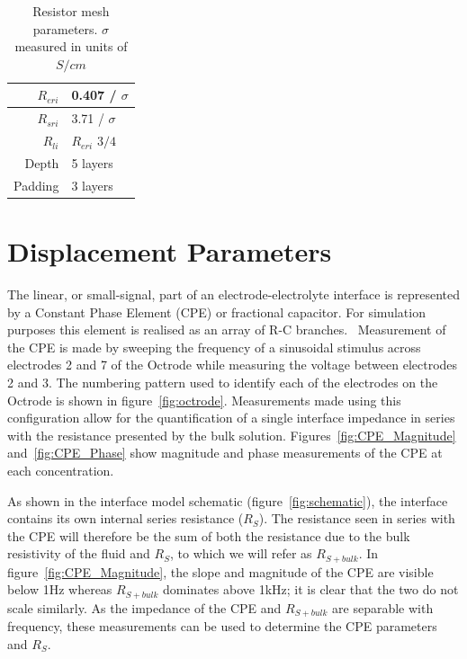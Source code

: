 \documentclass[journal, a4paper]{IEEEtran}
\begin{document}
\begin{table}
    \begin{center}
        \begin{tabular}{|r|l|}
            \hline
            $R_{eri}$ & 0.407 / $\sigma$ \\ \hline
            $R_{sri}$ & 3.71 / $\sigma$ \\ \hline
            $R_{li}$ & $R_{eri}$ $3/4$ \\ \hline
            Depth & 5 layers \\ \hline
            Padding & 3 layers \\ \hline
        \end{tabular}
    \end{center}
    \caption{Resistor mesh parameters. $\sigma$ measured in units of $S/cm$}
    \label{tab:RESparams}
\end{table}


\section{Displacement Parameters}
The linear, or small-signal, part of an electrode-electrolyte interface is represented by a Constant Phase Element (CPE) or fractional capacitor. For simulation purposes this element is realised as an array of R-C branches.~\cite{ScottSingle2013,Morrison59,Elwakil10} Measurement of the CPE is made by sweeping the frequency of a sinusoidal stimulus across electrodes 2 and 7 of the Octrode while measuring the voltage between electrodes 2 and 3. The numbering pattern used to identify each of the electrodes on the Octrode is shown in figure~\ref{fig:octrode}.
Measurements made using this configuration allow for the quantification of a single interface impedance in series with the resistance presented by the bulk solution.
Figures~\ref{fig:CPE_Magnitude} and~\ref{fig:CPE_Phase} show magnitude and phase measurements of the CPE at each concentration.

As shown in the interface model schematic (figure~\ref{fig:schematic}), the interface contains its own internal series resistance ($R_{S}$). The resistance seen in series with the CPE will therefore be the sum of both the resistance due to the bulk resistivity of the fluid and $R_{S}$, to which we will refer as $R_{S+bulk}$.
In figure~\ref{fig:CPE_Magnitude}, the slope and magnitude of the CPE are visible below 1\thinspace Hz whereas $R_{S+bulk}$  dominates above 1\thinspace kHz; it is clear that the two do not scale similarly.
As the impedance of the CPE and $R_{S+bulk}$ are separable with frequency, these measurements can be used to determine the CPE parameters and $R_{S}$.
\end{document}
